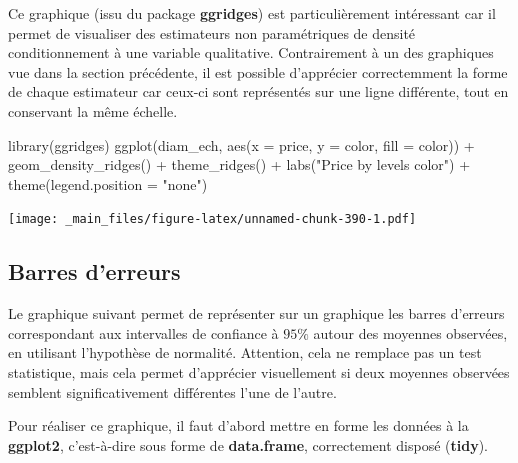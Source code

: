 \documentclass[
]{book}
\newenvironment{Shaded}{\begin{snugshade}}{\end{snugshade}}
\newcommand{\AttributeTok}[1]{\textcolor[rgb]{0.77,0.63,0.00}{#1}}
\newcommand{\FunctionTok}[1]{\textcolor[rgb]{0.00,0.00,0.00}{#1}}
\newcommand{\NormalTok}[1]{#1}
\newcommand{\SpecialCharTok}[1]{\textcolor[rgb]{0.00,0.00,0.00}{#1}}
\newcommand{\StringTok}[1]{\textcolor[rgb]{0.31,0.60,0.02}{#1}}
\theoremstyle{definition}
\theoremstyle{definition}
\theoremstyle{definition}
\theoremstyle{definition}
\theoremstyle{remark}
\begin{document}
Ce graphique (issu du package \textbf{ggridges}) est particulièrement intéressant car il permet de visualiser des estimateurs non paramétriques de densité conditionnement à une variable qualitative. Contrairement à un des graphiques vue dans la section précédente, il est possible d'apprécier correctemment la forme de chaque estimateur car ceux-ci sont représentés sur une ligne différente, tout en conservant la même échelle.

\begin{Shaded}
\begin{Highlighting}[]
\FunctionTok{library}\NormalTok{(ggridges)}
\FunctionTok{ggplot}\NormalTok{(diam\_ech, }
       \FunctionTok{aes}\NormalTok{(}\AttributeTok{x =}\NormalTok{ price, }
           \AttributeTok{y =}\NormalTok{ color, }
           \AttributeTok{fill =}\NormalTok{ color)) }\SpecialCharTok{+}
  \FunctionTok{geom\_density\_ridges}\NormalTok{() }\SpecialCharTok{+} 
  \FunctionTok{theme\_ridges}\NormalTok{() }\SpecialCharTok{+}
  \FunctionTok{labs}\NormalTok{(}\StringTok{"Price by levels color"}\NormalTok{) }\SpecialCharTok{+}
  \FunctionTok{theme}\NormalTok{(}\AttributeTok{legend.position =} \StringTok{"none"}\NormalTok{)}
\end{Highlighting}
\end{Shaded}

\texttt{[image: \_main\_files/figure-latex/unnamed-chunk-390-1.pdf]}

\hypertarget{barres-derreurs}{%
\subsection{Barres d'erreurs}\label{barres-derreurs}}

Le graphique suivant permet de représenter sur un graphique les barres d'erreurs correspondant aux intervalles de confiance à \(95\%\) autour des moyennes observées, en utilisant l'hypothèse de normalité. Attention, cela ne remplace pas un test statistique, mais cela permet d'apprécier visuellement si deux moyennes observées semblent significativement différentes l'une de l'autre.

Pour réaliser ce graphique, il faut d'abord mettre en forme les données à la \textbf{ggplot2}, c'est-à-dire sous forme de \textbf{data.frame}, correctement disposé (\textbf{tidy}).
\end{document}

